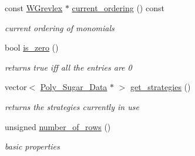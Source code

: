 \begin{Indent}
\begin{DoxyCompactItemize}
const \hyperlink{group__orderinggroup_class_w_grevlex}{W\+Grevlex} $\ast$ \hyperlink{group___g_b_computation_ad7c37d08523c27bbb1990534abd95461}{current\+\_\+ordering} () const
\begin{DoxyCompactList}\small\item\em current ordering of monomials \end{DoxyCompactList}\item 
\mbox{\label{group___g_b_computation_aee8c1358071a26e60b2e50f9678dcfb0}} 
bool \hyperlink{group___g_b_computation_aee8c1358071a26e60b2e50f9678dcfb0}{is\+\_\+zero} ()
\begin{DoxyCompactList}\small\item\em returns {\ttfamily true} iff all the entries are 0 \end{DoxyCompactList}\item 
\mbox{\label{group___g_b_computation_a1e58764d1bee3437e2bfa74fbb847b1a}} 
vector$<$ \hyperlink{group__strategygroup_class_poly___sugar___data}{Poly\+\_\+\+Sugar\+\_\+\+Data} $\ast$ $>$ \hyperlink{group___g_b_computation_a1e58764d1bee3437e2bfa74fbb847b1a}{get\+\_\+strategies} ()
\begin{DoxyCompactList}\small\item\em returns the strategies currently in use \end{DoxyCompactList}\item 
\mbox{\label{group___g_b_computation_ac56c717e4015d655e40b2c8033fa9d92}} 
unsigned \hyperlink{group___g_b_computation_ac56c717e4015d655e40b2c8033fa9d92}{number\+\_\+of\+\_\+rows} ()
\begin{DoxyCompactList}\small\item\em basic properties \end{DoxyCompactList}\end{DoxyCompactItemize}
\end{Indent}
